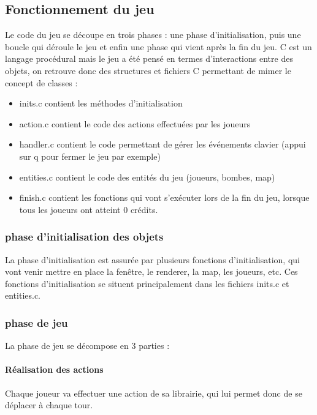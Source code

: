\documentclass[12pt, openany]{article}
\begin{document}
	\subsection{Fonctionnement du jeu}
	Le code du jeu se découpe en trois phases : une phase d'initialisation, puis une boucle qui déroule le jeu et enfin une phase qui vient après la fin du jeu. C est un langage procédural mais le jeu a été pensé en termes d'interactions entre des objets, on retrouve donc des structures et fichiers C permettant de mimer le concept de classes :\\
	\begin{itemize}[label=$-$]
		\item inits.c contient les méthodes d'initialisation\\
		\item action.c contient le code des actions effectuées par les joueurs\\
		\item handler.c contient le code permettant de gérer les événements clavier (appui sur q pour fermer le jeu par exemple)\\
		\item entities.c contient le code des entités du jeu (joueurs, bombes, map)\\
		\item finish.c contient les fonctions qui vont s'exécuter lors de la fin du jeu, lorsque tous les joueurs ont atteint 0 crédits.\\
	\end{itemize}
	
	\subsubsection{phase d'initialisation des objets}
	La phase d'initialisation est assurée par plusieurs fonctions d'initialisation, qui vont venir mettre en place la fenêtre, le renderer, la map, les joueurs, etc. Ces fonctions d'initialisation se situent principalement dans les fichiers inits.c et entities.c.\\
	
	\subsubsection{phase de jeu}
	La phase de jeu se décompose en 3 parties :
	\paragraph{Réalisation des actions}
	Chaque joueur va effectuer une action de sa librairie, qui lui permet donc de se déplacer à chaque tour.
	
\end{document}
